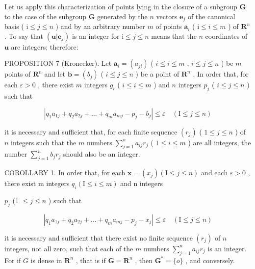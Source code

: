 Let us apply this characterization of points lying in the closure of a subgroup \(\mathbf{G}\) to the case of the subgroup \(\mathbf{G}\) generated by the \(n\) vectors \(\boldsymbol{e}_j\) of the canonical basis ( \(\mathrm{i} \leqslant j \leqslant n\) ) and by an arbitrary number \(m\) of points \(\boldsymbol{a}_i\) ( \(\mathrm{i} \leqslant i \leqslant m\) ) of \(\mathbf{R}^n\) . To say that \((\boldsymbol{u}|\boldsymbol{e}_j)\) is an integer for \(\mathrm{i} \leqslant j \leqslant n\) means that the \(n\) coordinates of \(\boldsymbol{u}\) are integers; therefore:

PROPOSITION 7 (Kronecker). Let \(\boldsymbol{a}_i = (a_{ji})\) ( \(i \leqslant i \leqslant m\) , \(i \leqslant j \leqslant n\) ) be \(m\) points of \(\mathbf{R}^n\) and let \(\boldsymbol{b} = (b_j)\) ( \(i \leqslant j \leqslant n\) ) be a point of \(\mathbf{R}^n\) . In order that, for each \(\varepsilon > 0\) , there exist \(m\) integers \(g_i\) ( \(i \leqslant i \leqslant m\) ) and \(n\) integers \(p_j\) ( \(i \leqslant j \leqslant n\) ) such that

\[
\left| q _ {1} a _ {1 j} + q _ {2} a _ {2 j} + \dots + q _ {m} a _ {m j} - p _ {j} - b _ {j} \right| \leqslant \varepsilon \quad (\mathrm{I} \leqslant j \leqslant n)
\]

it is necessary and sufficient that, for each finite sequence \((r_j)\) ( \(1 \leqslant j \leqslant n\) ) of \(n\) integers such that the \(m\) numbers \(\sum_{j=1}^{n} a_{ij} r_j\) ( \(1 \leqslant i \leqslant m\) ) are all integers, the number \(\sum_{j=1}^{n} b_j r_j\) should also be an integer.

COROLLARY 1. In order that, for each \(\boldsymbol{x} = (x_{j}) (\mathrm{I} \leqslant j \leqslant n)\) and each \(\varepsilon > 0\) , there exist m integers \(q_{i} (\mathrm{I} \leqslant i \leqslant m)\) and n integers

\(p_j\) (1 \(\leqslant j\leqslant n\) ) such that

\[
\left| q _ {1} a _ {1 j} + q _ {2} a _ {2 j} + \dots + q _ {m} a _ {m j} - p _ {j} - x _ {j} \right| \leqslant \varepsilon \quad (\mathrm{I} \leqslant j \leqslant n)
\]

it is necessary and sufficient that there exist no finite sequence \((r_j)\) of \(n\) integers, not all zero, such that each of the \(m\) numbers \(\sum_{j=1}^{n} a_{ij} r_j\) is an integer. For if \(G\) is dense in \(\mathbf{R}^n\) , that is if \(\overline{\mathbf{G}} = \mathbf{R}^n\) , then \(\mathbf{G}^* = \{o\}\) , and conversely.


